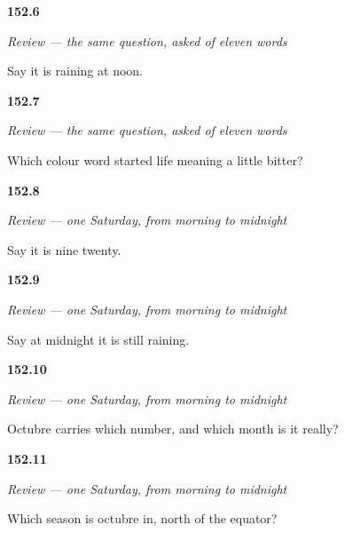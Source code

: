 \noindent\begin{minipage}[t]{\linewidth}
\raggedright
\hypertarget{review-ES-C40-repaso-palabras-con-historia-llueve}{\textbf{152.6}} \emph{Review — the same question, asked of eleven words}\par
\small Say it is raining at noon.
\end{minipage}\par\medskip

\noindent\begin{minipage}[t]{\linewidth}
\raggedright
\hypertarget{review-ES-C40-repaso-palabras-con-historia-amarillo}{\textbf{152.7}} \emph{Review — the same question, asked of eleven words}\par
\small Which colour word started life meaning a little bitter?
\end{minipage}\par\medskip

\noindent\begin{minipage}[t]{\linewidth}
\raggedright
\hypertarget{review-ES-C40-repaso-un-sabado-de-octubre-hora}{\textbf{152.8}} \emph{Review — one Saturday, from morning to midnight}\par
\small Say it is nine twenty.
\end{minipage}\par\medskip

\noindent\begin{minipage}[t]{\linewidth}
\raggedright
\hypertarget{review-ES-C40-repaso-un-sabado-de-octubre-lluvia}{\textbf{152.9}} \emph{Review — one Saturday, from morning to midnight}\par
\small Say at midnight it is still raining.
\end{minipage}\par\medskip

\noindent\begin{minipage}[t]{\linewidth}
\raggedright
\hypertarget{review-ES-C40-repaso-un-sabado-de-octubre-ocho}{\textbf{152.10}} \emph{Review — one Saturday, from morning to midnight}\par
\small Octubre carries which number, and which month is it really?
\end{minipage}\par\medskip

\noindent\begin{minipage}[t]{\linewidth}
\raggedright
\hypertarget{review-ES-C40-repaso-un-sabado-de-octubre-estacion}{\textbf{152.11}} \emph{Review — one Saturday, from morning to midnight}\par
\small Which season is octubre in, north of the equator?
\end{minipage}\par\medskip

